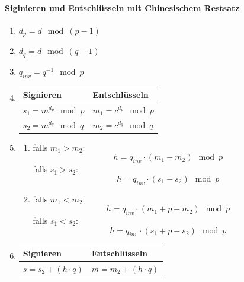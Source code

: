\documentclass[8pt,a4paper,landscape]{article}
\begin{document}
\begin{multicols}{4}
\paragraph{Siginieren und Entschlüsseln mit Chinesischem Restsatz}
\begin{enumerate}
\item $d_p = d \mod (p-1)$ 
\item $d_q = d \mod (q-1)$
\item $q_{inv} = q^{-1} \mod p$
\item 
\begin{tabular}[t]{p{2.7cm} | p{2.7cm}}
Signieren & Entschlüsseln \\ \hline
$s_1 = m^{d_p} \mod p$ & $m_1 = c^{d_p} \mod p$ \\[0.2cm]
$s_2 = m^{d_q} \mod q$ & $m_2 = c^{d_q} \mod q$
\end{tabular}
\item \begin{enumerate}
\item falls $m_1 > m_2$: \[h = q_{inv} \cdot (m_1 - m_2) \mod p\] 
		falls $s_1 > s_2$: \[h = q_{inv} \cdot (s_1 - s_2) \mod p\] 
\item falls $m_1 < m_2$: \[h = q_{inv} \cdot (m_1 + p - m_2) \mod p\] 
		falls $s_1 < s_2$: \[h = q_{inv} \cdot (s_1 + p - s_2) \mod p\]\end{enumerate}
\item \begin{tabular}[t]{p{2.7cm} | p{2.7cm}}
Signieren & Entschlüsseln \\ \hline
$s = s_2 + (h \cdot q)$ & $m = m_2 + (h \cdot q)$
\end{tabular}
\end{enumerate}


\end{multicols}
\end{document}
